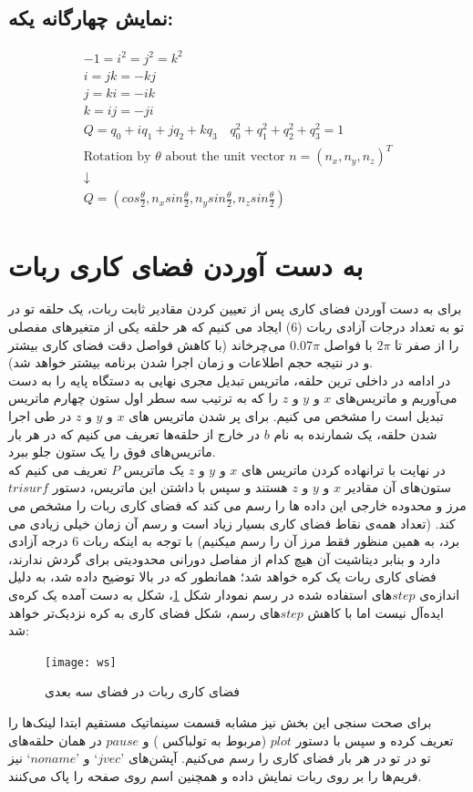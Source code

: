 \documentclass{article}
\begin{document}
\subsection{نمایش چهارگانه یکه:}
\begin{latin}
\begin{gather*}
-1 = i^2 = j^2 = k^2 \\ i = jk = -kj\\ j = ki = -ik \\k = ij = -ji \\
Q = q_0 + iq_1 + jq_2 + kq_3 \quad q_0^2 + q_1^2 + q_2^2 + q_3^2 = 1 \\
\text{Rotation by $\theta$ about the unit vector $n = (n_x, n_y, n_z)^T$} \\
\downarrow \\
Q = (cos \frac{\theta}{2},n_x sin \frac{\theta}{2}, n_y sin \frac{\theta}{2},n_z sin \frac{\theta}{2})
\end{gather*}
\end{latin}

\section{به دست آوردن فضای کاری ربات}
برای به دست آوردن فضای کاری پس از تعیین کردن مقادیر ثابت ربات، یک حلقه تو در تو به تعداد درجات آزادی ربات (6) ایجاد می کنیم که هر حلقه یکی از متغیر‌های مفصلی را از صفر تا $2\pi$ با فواصل $0.07\pi$ می‌چرخاند (با کاهش فواصل دقت فضای کاری بیشتر و در نتیجه حجم اطلاعات و زمان اجرا شدن برنامه بیشتر خواهد شد).
\\
در ادامه در داخلی ترین حلقه، ماتریس تبدیل مجری نهایی به دستگاه پایه را به دست می‌آوریم و ماتریس‌های $x$ و $y$ و $z$ را که به ترتیب سه سطر اول ستون چهارم ماتریس تبدیل است را مشخص می کنیم. 
برای پر شدن ماتریس های $x$ و $y$ و $z$ در طی اجرا شدن حلقه، یک شمارنده  به نام $b$ در خارج از حلقه‌ها تعریف می کنیم که در هر بار ماتریس‌های فوق را یک ستون جلو ببرد.
\\
در نهایت با ترانهاده کردن ماتریس های $x$ و $y$ و $z$ یک ماتریس $P$ تعریف می کنیم که ستون‌های آن مقادیر $x$ و $y$ و $z$ هستند و سپس با داشتن این ماتریس، دستور $trisurf$ مرز و محدوده خارجی این داده ها را رسم می کند که فضای کاری ربات را مشخص می کند. (تعداد همه‌ی نقاط فضای کاری بسیار زیاد است و رسم آن زمان خیلی زیادی می برد، به همین منظور فقط مرز آن را رسم میکنیم)
با توجه به اینکه ربات 6 درجه آزادی دارد و بنابر دیتاشیت آن هیچ کدام از مفاصل دورانی محدودیتی برای گردش ندارند، فضای کاری ربات یک کره خواهد شد؛ همانطور که در بالا توضیح داده شد، به دلیل اندازه‌ی $step$های استفاده شده در رسم نمودار شکل \ref{fig:ws}، شکل به دست آمده یک کره‌ی ایده‌آل نیست اما با کاهش $step$های رسم، شکل فضای کاری به کره نزدیک‌تر خواهد شد:
\begin{figure}[H]%
	\centering
	\texttt{[image: ws]}
    \caption{فضای کاری ربات در فضای سه بعدی}
    \label{fig:ws}
\end{figure}
برای صحت سنجی این بخش نیز مشابه قسمت سینماتیک مستقیم ابتدا لینک‌ها را تعریف کرده و سپس با دستور $plot$ (مربوط به تولباکس ) و $pause$ در همان حلقه‌های تو در تو در هر بار فضای کاری را رسم می‌کنیم. آپشن‌های $‘jvec’$ و $‘noname’$ نیز فریم‌ها را بر روی ربات نمایش داده و همچنین اسم روی صفحه را پاک می‌کنند.
\end{document}

